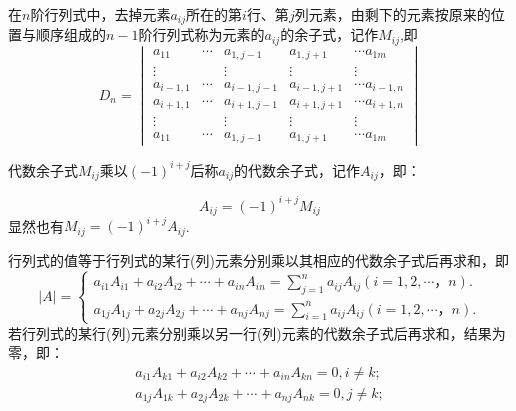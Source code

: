 \documentclass[lang=cn,10pt]{elegantbook}
\begin{document}
\begin{definition}[余子式] \label{def:yzs} 
在$n$阶行列式中，去掉元素$a_{ij}$所在的第$i$行、第$j$列元素，由剩下的元素按原来的位置与顺序组成的$n-1$阶行列式称为元素的$a_{ij}$的余子式，记作$M_{ij}$,即
\begin{equation}
   \label{yzs}
   D_n = \begin{vmatrix}
       a_{11}&\cdots &a_{1,j-1} & a_{1,j+1}& \cdots a_{1m}\\
       \vdots&     &\vdots&       \vdots&       \vdots\\
       a_{i-1,1}&\cdots &a_{i-1,j-1} & a_{i-1,j+1}& \cdots a_{i-1,n}\\
       a_{i+1,1}&\cdots &a_{i+1,j-1} & a_{i+1,j+1}& \cdots a_{i+1,n}\\
       \vdots&     &\vdots&       \vdots&       \vdots\\
       a_{11}&\cdots &a_{1,j-1} & a_{1,j+1}& \cdots a_{1m}
   \end{vmatrix}
\end{equation}
\end{definition}

\begin{definition}[代数余子式] \label{def:dsyzs} 
代数余子式$M_{ij}$乘以$(-1)^{i+j}$后称$a_{ij}$的代数余子式，记作$A_{ij}$，即：

\begin{equation}
   \label{dsyzs}
A_{ij}=(-1)^{i+j}M_{ij}
\end{equation}
显然也有$M_{ij}=(-1)^{i+j}A_{ij}$.
\end{definition}

\begin{definition} \label{def:hlszk} 
行列式的值等于行列式的某行(列)元素分别乘以其相应的代数余子式后再求和，即
\begin{equation}
   \label{hlszk}
 \vert A \vert = \left \{ 
 \begin{aligned} 
  a_{i1}A_{i1}+a_{i2}A_{i2}+\cdots+a_{in}A_{in} = \sum \limits_{j=1}^{n}a_{ij}A_{ij}(i=1,2,\cdots，n).\\
  a_{1j}A_{1j}+a_{2j}A_{2j}+\cdots+a_{nj}A_{nj} = \sum \limits_{i=1}^{n}a_{ij}A_{ij}(i=1,2,\cdots，n).
 \end{aligned}
 \right.
\end{equation}
若行列式的某行(列)元素分别乘以另一行(列)元素的代数余子式后再求和，结果为零，即：
\begin{equation}
  \begin{aligned} 
  a_{i1}A_{k1}+a_{i2}A_{k2}+\cdots+a_{in}A_{kn} = 0,i\ne k;\\
  a_{1j}A_{1k}+a_{2j}A_{2k}+\cdots+a_{nj}A_{nk} = 0,j\ne k;
 \end{aligned}
\end{equation}

\end{definition}
\end{document}
